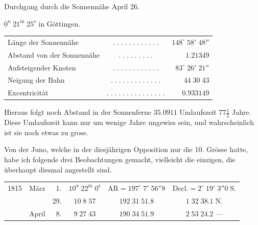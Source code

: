 \begin{center}\fontsize{10}{12}\selectfont Durchgang durch die Sonnennähe April 26.\par $0^{\mathrm u}\;21^{\mathrm m}\;25^{\mathrm s}$ in Göttingen.\end{center}
\begin{center}\fontsize{9}{11}\selectfont\setlength{\tabcolsep}{2pt}\renewcommand{\arraystretch}{1.15}\begin{tabular}{lcr}
Länge der Sonnennähe & $.\;.\;.\;.\;.\;.\;.\;.\;.\;.\;.\;.$ & $148^\circ\;58'\;48''$\\
Abstand von der Sonnennähe & $.\;.\;.\;.\;.\;.\;.\;.\;.$ & $1.21349$\\
Aufsteigender Knoten & $.\;.\;.\;.\;.\;.\;.\;.\;.\;.\;.\;.$ & $83^\circ\;26'\;21''$\\
Neigung der Bahn & $.\;.\;.\;.\;.\;.\;.\;.\;.\;.\;.\;.\;.$ & $44\;30\;43$\\
Excentricität & $.\;.\;.\;.\;.\;.\;.\;.\;.\;.\;.\;.\;.\;.\;.$ & $0.933149$\\
\end{tabular}\end{center}

\par\indent Hieraus folgt noch Abstand in der Sonnenferne $35.0911$ Umlaufszeit $77\tfrac12$ Jahre. Diese Umlaufszeit
kann nur um wenige Jahre ungewiss sein, und wahrscheinlich ist sie noch etwas zu gross.

\par\indent Von der Juno, welche in der diesjährigen Opposition nur die 10. Grösse hatte, habe ich folgende
drei Beobachtungen gemacht, vielleicht die einzigen, die überhaupt diesmal angestellt sind.

\begin{center}\fontsize{9}{11}\selectfont\setlength{\tabcolsep}{2pt}\renewcommand{\arraystretch}{1.15}\begin{tabular}{llrccc}
1815 & März & 1. & $10^{\mathrm u}\;22^{\mathrm m}\;0^{\mathrm s}$ & $\mathrm{AR}=197^\circ\;7'\;56''8$ & $\mathrm{Decl.}=2^\circ\;19'\;3''0\;\mathrm{S.}$\\
 & & 29. & $10\;8\;57$ & $192\;31\;51.8$ & $1\;32\;38.1\;\mathrm{N.}$\\
 & April & 8. & $9\;27\;43$ & $190\;34\;51.9$ & $2\;53\;24.2$ ---\\
\end{tabular}\end{center}

